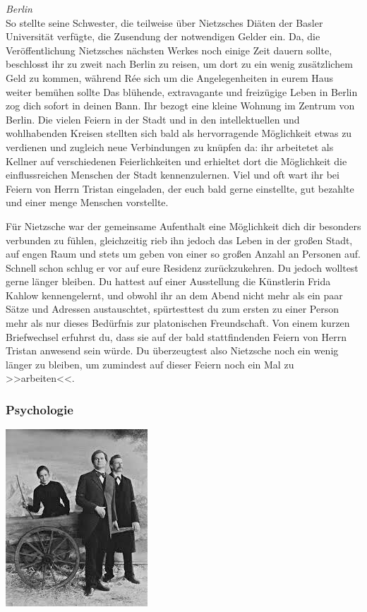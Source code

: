\documentclass[12pt, a4paper, openany]{report}
\begin{document}
\textit{Berlin}\\
So stellte seine Schwester, die teilweise über Nietzsches Diäten der Basler Universität verfügte, die Zusendung der notwendigen Gelder ein.
Da, die Veröffentlichung Nietzsches nächsten Werkes noch einige Zeit dauern sollte, beschlosst ihr zu zweit nach Berlin zu reisen, um dort zu ein wenig zusätzlichem Geld zu kommen, während Rée sich um die Angelegenheiten in eurem Haus weiter bemühen sollte
Das blühende, extravagante und freizügige Leben in Berlin zog dich sofort in deinen Bann. 
Ihr bezogt eine kleine Wohnung im Zentrum von Berlin. 
Die vielen Feiern in der Stadt und in den intellektuellen und wohlhabenden Kreisen stellten sich bald als hervorragende Möglichkeit etwas zu verdienen und zugleich neue Verbindungen zu knüpfen da:
ihr arbeitetet als Kellner auf verschiedenen Feierlichkeiten und erhieltet dort die Möglichkeit die einflussreichen Menschen der Stadt kennenzulernen. 
Viel und oft wart ihr bei Feiern von Herrn Tristan eingeladen, der euch bald gerne einstellte, gut bezahlte und einer menge Menschen vorstellte.

Für Nietzsche war der gemeinsame Aufenthalt eine Möglichkeit dich dir besonders verbunden zu fühlen, gleichzeitig rieb ihn jedoch das Leben in der großen Stadt, auf engen Raum und stets um geben von einer so großen Anzahl an Personen auf. 
Schnell schon schlug er vor auf eure Residenz zurückzukehren. 
Du jedoch wolltest gerne länger bleiben.
Du hattest auf einer Ausstellung die Künstlerin Frida Kahlow kennengelernt, und obwohl ihr an dem Abend nicht mehr als ein paar Sätze und Adressen austauschtet, spürtesttest du zum ersten zu einer Person mehr als nur dieses Bedürfnis zur platonischen Freundschaft. 
Von einem kurzen Briefwechsel erfuhrst du, dass sie auf der bald stattfindenden Feiern von Herrn Tristan anwesend sein würde. 
Du überzeugtest also Nietzsche noch ein wenig länger zu bleiben, um zumindest auf dieser Feiern noch ein Mal zu >>arbeiten<<.

\subsubsection{Psychologie}
\includegraphics{lou.jpeg}
\end{document}

